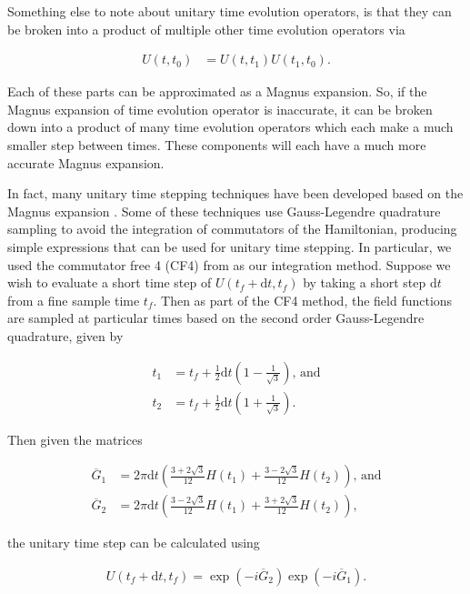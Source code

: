 \documentclass{jors}
\begin{document}
		Something else to note about unitary time evolution operators, is that they can be broken into a product of multiple other time evolution operators via

		\begin{align}
			U(t, t_0) &= U(t, t_1)U(t_1, t_0).
		\end{align}

		Each of these parts can be approximated as a Magnus expansion. So, if the Magnus expansion of time evolution operator is inaccurate, it can be broken down into a product of many time evolution operators which each make a much smaller step between times. These components will each have a much more accurate Magnus expansion.

		In fact, many unitary time stepping techniques have been developed based on the Magnus expansion \cite{auer_magnus_2018}. Some of these techniques use Gauss-Legendre quadrature sampling to avoid the integration of commutators of the Hamiltonian, producing simple expressions that can be used for unitary time stepping. In particular, we used the commutator free 4 (CF4) from \cite{auer_magnus_2018} as our integration method. Suppose we wish to evaluate a short time step of \(U(t_f + \mathrm{d}t, t_f)\) by taking a short step \(\mathrm{d}t\) from a fine sample time \(t_f\). Then as part of the CF4 method, the field functions are sampled at particular times based on the second order Gauss-Legendre quadrature, given by
			
		\begin{align}
			t_1 &= t_f + \frac12 \mathrm{d}t\left(1 - \frac{1}{\sqrt{3}}\right)\textrm{, and}\\
			t_2 &= t_f + \frac12 \mathrm{d}t\left(1 + \frac{1}{\sqrt{3}}\right).
		\end{align}
		
		Then given the matrices
		
		\begin{align}
			\overline{G}_1 &= 2\pi\mathrm{d}t\left(\frac{3 + 2\sqrt{3}}{12}H(t_1) + \frac{3 - 2\sqrt{3}}{12}H(t_2)\right)\textrm{, and}\label{eq:cf4_sample_1}\\
			\overline{G}_2 &= 2\pi\mathrm{d}t\left(\frac{3 - 2\sqrt{3}}{12}H(t_1) + \frac{3 + 2\sqrt{3}}{12}H(t_2)\right),\label{eq:cf4_sample_2}
		\end{align}

		the unitary time step can be calculated using

		\begin{align}
			U(t_f + \mathrm{d}t, t_f) = \exp(-i\overline{G}_2)\exp(-i\overline{G}_1).\label{eq:cf4_implementation}
		\end{align}
\end{document}
